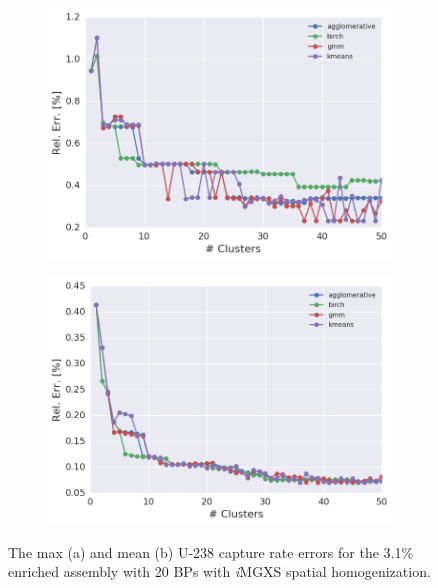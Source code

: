 \begin{figure}[h!]
\centering
\begin{subfigure}{0.9\textwidth}
  \centering
  \includegraphics[width=\linewidth]{figures/results/err-by-cluster/assm-31-20BPs/max-rel-err}
  \caption{}
  \label{fig:chap11-max-capt-err-by-cluster-assm-31-20BPs}
\end{subfigure}
\begin{subfigure}{0.9\textwidth}
  \centering
  \includegraphics[width=\linewidth]{figures/results/err-by-cluster/assm-31-20BPs/mean-rel-err}
  \caption{}
  \label{fig:chap11-mean-capt-err-by-cluster-assm-31-20BPs}
\end{subfigure}
\caption[U-238 capture error the 3.1\% enriched assembly with 20 BPs]{The max (a) and mean (b) U-238 capture rate errors for the 3.1\% enriched assembly with 20 \acp{BP} with \textit{i}\ac{MGXS} spatial homogenization.}
\label{fig:chap11-capt-err-by-cluster-assm-31-20BPs}
\end{figure}

